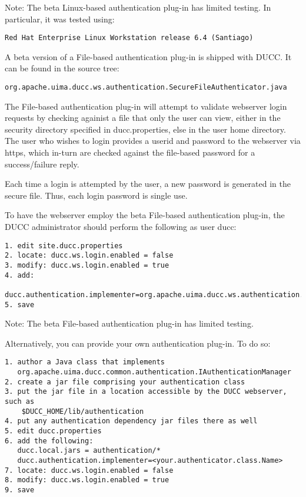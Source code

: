     Note: The beta Linux-based authentication plug-in has limited testing.
    In particular, it was tested using:
\begin{verbatim}
Red Hat Enterprise Linux Workstation release 6.4 (Santiago)
\end{verbatim}    
    
    A beta version of a File-based authentication plug-in is shipped with DUCC.
    It can be found in the source tree:
\begin{verbatim}
org.apache.uima.ducc.ws.authentication.SecureFileAuthenticator.java
\end{verbatim}

    The File-based authentication plug-in will attempt to validate webserver
    login requests by checking againist a file that only the user can view,
    either in the security directory specified in ducc.properties, else in 
    the user home directory.  
    The user who wishes to login provides a userid and password to the webserver
    via https, which in-turn are checked against the file-based password for a 
    success/failure reply.
    
    Each time a login is attempted by the user, a new password is generated
    in the secure file.  Thus, each login password is single use.
    
    To have the webserver employ the beta File-based authentication plug-in,
    the DUCC administrator should perform the following as user ducc:
\begin{verbatim}    
1. edit site.ducc.properties
2. locate: ducc.ws.login.enabled = false
3. modify: ducc.ws.login.enabled = true
4. add:
   ducc.authentication.implementer=org.apache.uima.ducc.ws.authentication.SecureFileAuthenticator
5. save
\end{verbatim}

    Note: The beta File-based authentication plug-in has limited testing.
    
    Alternatively, you can provide your own authentication plug-in.  To do so:
\begin{verbatim}    
1. author a Java class that implements 
   org.apache.uima.ducc.common.authentication.IAuthenticationManager
2. create a jar file comprising your authentication class
3. put the jar file in a location accessible by the DUCC webserver, such as 
    $DUCC_HOME/lib/authentication
4. put any authentication dependency jar files there as well
5. edit ducc.properties
6. add the following:
   ducc.local.jars = authentication/*
   ducc.authentication.implementer=<your.authenticator.class.Name>
7. locate: ducc.ws.login.enabled = false
8. modify: ducc.ws.login.enabled = true
9. save   
\end{verbatim}    

